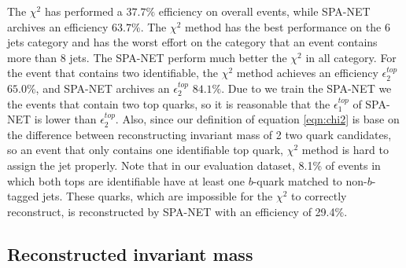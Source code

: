 The $\chi^{2}$ has performed a $37.7\%$ efficiency on overall events, while SPA-NET archives an efficiency $63.7\%$. The $\chi^{2}$ method has the best performance on the 6 jets category and has the worst effort on the category that an event contains more than 8 jets. The SPA-NET perform much better the $\chi^{2}$ in all category. For the event that contains two identifiable, the $\chi^{2}$ method achieves an efficiency $\epsilon^{top}_{2}$ $65.0\%$, and SPA-NET archives an $\epsilon^{top}_{2}$ $84.1\%$. Due to we train the SPA-NET we the events that contain two top quarks, so it is reasonable that the $\epsilon^{top}_{1}$ of SPA-NET is lower than $\epsilon^{top}_{2}$. Also, since our definition of equation \ref{eqn:chi2} is base on the difference between reconstructing invariant mass of 2 two quark candidates, so an event that only contains one identifiable top quark, $\chi^{2}$ method is hard to assign the jet properly. Note that in our evaluation dataset, 8.1\% of events in which both tops are identifiable have at least one $b$-quark matched to non-$b$-tagged jets. These quarks, which are impossible for the $\chi^2$ to correctly reconstruct, is reconstructed by SPA-NET with an efficiency of 29.4\%. 

\subsection{Reconstructed invariant mass }\label{subsec:reco inv mass }

